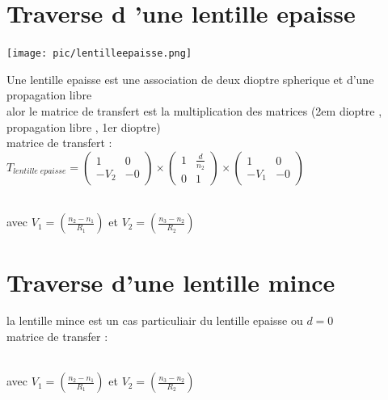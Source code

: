 \documentclass[12pt]{book}
\begin{document}
        \section{Traverse d 'une lentille epaisse}
            \begin{center}
                \texttt{[image: pic/lentilleepaisse.png]}
            \end{center}
            Une lentille epaisse est une association de deux dioptre spherique et d'une propagation libre  \\
            alor le matrice de transfert est la  multiplication des matrices (2em dioptre , propagation libre , 1er dioptre)
            \\
            matrice de transfert : 
            $
            T_{lentille \; epaisse}= 
            \begin{pmatrix}
                1 & 0 \\
                -V_2& -0
            \end{pmatrix} \times
            \begin{pmatrix}
                1 & \frac{d}{n_2}\\
                0 & 1
            \end{pmatrix} \times
            \begin{pmatrix}
                1 & 0 \\
                -V_1& -0
            \end{pmatrix}
            $          
            \begin{center}
                 \\ avec $V_1 = (\frac{n_2 - n_1}{R_1})$ et $V_2 = (\frac{n_3 - n_2}{R_2})$
            \end{center} 
        \section{Traverse d'une lentille mince}
            la lentille mince est un cas particuliair du lentille epaisse ou $d=0$
            \\ matrice de transfer :
            \begin{center}
                 \\ avec $V_1 = (\frac{n_2 - n_1}{R_1})$ et $V_2 = (\frac{n_3 - n_2}{R_2})$
            \end{center} 
\end{document}

